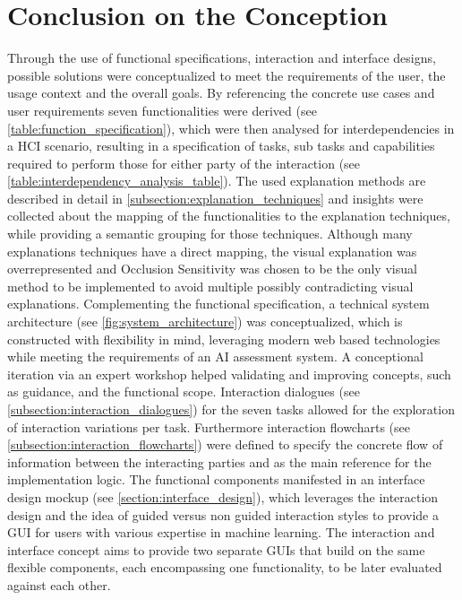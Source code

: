 \documentclass[11pt,a4paper,english]{scrreprt}
\begin{document}
\section{Conclusion on the Conception}
Through the use of functional specifications, interaction and interface designs, possible solutions were conceptualized to meet the requirements of the user, the usage context and the overall goals. By referencing the concrete use cases and user requirements seven functionalities were derived (see \autoref{table:function_specification}), which were then analysed for interdependencies in a HCI scenario, resulting in a specification of tasks, sub tasks and capabilities required to perform those for either party of the interaction (see \autoref{table:interdependency_analysis_table}). The used explanation methods are described in detail in \autoref{subsection:explanation_techniques} and insights were collected about the mapping of the functionalities to the explanation techniques, while providing a semantic grouping for those techniques. Although many explanations techniques have a direct mapping, the visual explanation was overrepresented and Occlusion Sensitivity was chosen to be the only visual method to be implemented to avoid multiple possibly contradicting visual explanations. Complementing the functional specification, a technical system architecture (see \autoref{fig:system_architecture}) was conceptualized, which is constructed with flexibility in mind, leveraging modern web based technologies while meeting the requirements of an AI assessment system. A conceptional iteration via an expert workshop helped validating and improving concepts, such as guidance, and the functional scope. Interaction dialogues (see \autoref{subsection:interaction_dialogues}) for the seven tasks allowed for the exploration of interaction variations per task. Furthermore interaction flowcharts (see \autoref{subsection:interaction_flowcharts}) were defined to specify the concrete flow of information between the interacting parties and as the main reference for the implementation logic. The functional components manifested in an interface design mockup (see \autoref{section:interface_design}), which leverages the interaction design and the idea of guided versus non guided interaction styles to provide a GUI for users with various expertise in machine learning. The interaction and interface concept aims to provide two separate GUIs that build on the same flexible components, each encompassing one functionality, to be later evaluated against each other.
\end{document}

